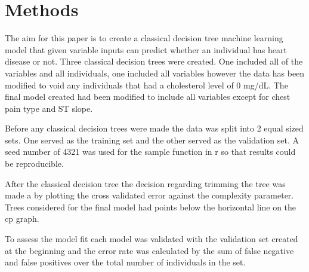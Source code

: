 \documentclass[12pt]{article}
\begin{document}
\section{Methods}
\label{sec:meth}


The aim for this paper is to create a classical decision tree machine learning model that given variable inputs can predict whether an individual has heart disease or not.
Three classical decision trees were created. One included all of the variables and all individuals, one included all variables however the data has been modified to void any individuals that had a cholesterol level of 0 mg/dL. The final model created had been modified to include all variables except for chest pain type and ST slope. \par
Before any classical decision trees were made the data was split into 2 equal sized sets. One served as the training set and the other served as the validation set. A seed number of 4321 was used for the sample function in r so that results could be reproducible. \par
After the classical decision tree the decision regarding trimming the tree was made a by plotting the cross validated error against the complexity parameter. Trees considered for the final model had points below the horizontal line on the cp graph. \par
To assess the model fit each model was validated with the validation set created at the beginning and the error rate was calculated by the sum of false negative and false positives over the total number of individuals in the set. \par
\end{document}
